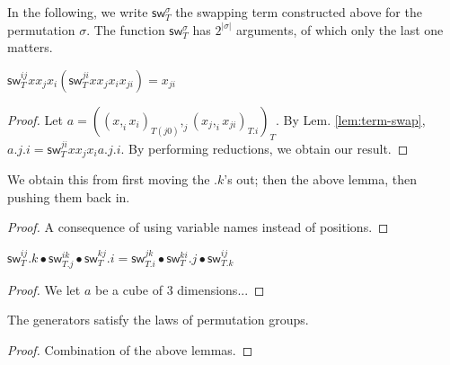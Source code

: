\documentclass[10pt,a4paper]{article}
\newcommand\CC[4]{(#2,_{#1} #3)_{#4}}
\newcommand\sw[2]{\mathsf{sw}^{#1}_{#2}}
\begin{document}
In the following, we write $\sw {σ} T$ the swapping term constructed
above for the permutation $σ$. The function $\sw {σ} T$ has $2^{|σ|}$
arguments, of which only the last one matters.

\begin{lemma}
  $\sw{ij} T x x_j x_i (\sw {ji} T x x_j x_i x_{ji}) = x_{ji}$ 
\end{lemma}
\begin{proof}
  Let $a = \CC j {\CC i x {x_i} {T(j0)}} {\CC i {x_j} {x_{ji}} {T.i}} T$.
  By Lem. \ref{lem:term-swap}, $a.j.i = \sw {ji} T x x_j x_i
  a.j.i$. By performing reductions, we obtain our result.
\end{proof}
\begin{lemma}[$σ_i^2 = 1$]
  We obtain this from first moving the $.k$'s out; then the above lemma, then pushing them back in.
\end{lemma}
\begin{lemma}[$σ_i ∘ σ_j = σ_j ∘ σ_i$ if $abs(j-i) > 1$]
  
\end{lemma}
\begin{proof}
  A consequence of using variable names instead of positions.
\end{proof}
\begin{lemma}
  [$\sigma_i ∘\sigma_{i+1} ∘\sigma_i = \sigma_{i+1} ∘\sigma_i ∘\sigma_{i+1}$]
  $\sw{ij}{T}.k ∙ \sw{ik}{T.j} ∙ \sw{kj}T.i = \sw{jk}{T.i} ∙ \sw{ki}T.j ∙ \sw{ij}{T.k}$
\end{lemma}
\begin{proof}
  We let $a$ be a cube of 3 dimensions...
\end{proof}
\begin{theorem}
  The generators satisfy the laws of permutation groups.
\end{theorem}
\begin{proof}
  Combination of the above lemmas.
\end{proof}
\end{document}
